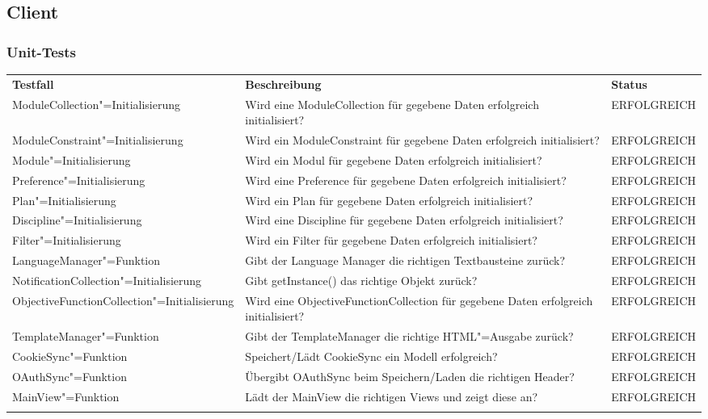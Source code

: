 \FloatBarrier
\subsection{Client}
\subsubsection*{Unit-Tests}
\begin{longtable}{| >{\hspace{0pt}} p{} | >{\hspace{0pt}} p{} | >{\hspace{0pt}} p{} |}
	\hline
	\textbf{Testfall} & \textbf{Beschreibung} & \textbf{Status} \\ 
	\hhline{|=|=|=|}  
	\endfirsthead
	\endhead
	
	ModuleCollection"=Initialisierung & Wird eine ModuleCollection für gegebene Daten erfolgreich initialisiert?  & ERFOLGREICH \\ \hline
	ModuleConstraint"=Initialisierung & Wird ein ModuleConstraint für gegebene Daten erfolgreich initialisiert? & ERFOLGREICH \\ \hline
	Module"=Initialisierung & Wird ein Modul für gegebene Daten erfolgreich initialisiert? & ERFOLGREICH \\ \hline
	Preference"=Initialisierung & Wird eine Preference für gegebene Daten erfolgreich initialisiert? & ERFOLGREICH \\ \hline
	Plan"=Initialisierung & Wird ein Plan für gegebene Daten erfolgreich initialisiert? & ERFOLGREICH \\ \hline
	Discipline"=Initialisierung & Wird eine Discipline für gegebene Daten erfolgreich initialisiert? & ERFOLGREICH \\ \hline
	Filter"=Initialisierung & Wird ein Filter für gegebene Daten erfolgreich initialisiert? & ERFOLGREICH \\ \hline
	LanguageManager"=Funktion & Gibt der Language Manager die richtigen Textbausteine zurück? & ERFOLGREICH \\ \hline
	NotificationCollection"=Initialisierung & Gibt getInstance() das richtige Objekt zurück? & ERFOLGREICH \\ \hline
	ObjectiveFunctionCollection"=Initialisierung & Wird eine ObjectiveFunctionCollection für gegebene Daten erfolgreich initialisiert? & ERFOLGREICH \\ \hline
	TemplateManager"=Funktion & Gibt der TemplateManager die richtige HTML"=Ausgabe zurück? & ERFOLGREICH \\ \hline
	CookieSync"=Funktion & Speichert/Lädt CookieSync ein Modell erfolgreich? & ERFOLGREICH \\ \hline
	OAuthSync"=Funktion & Übergibt OAuthSync beim Speichern/Laden die richtigen Header? & ERFOLGREICH \\ \hline
	MainView"=Funktion & Lädt der MainView die richtigen Views und zeigt diese an? & ERFOLGREICH \\	 
	\hhline{|=|=|=|}   
\end{longtable}


